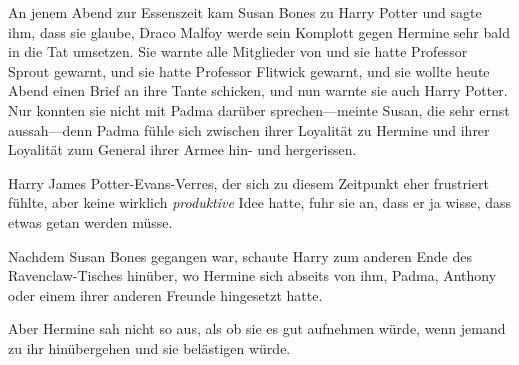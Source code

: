 \later

An jenem Abend zur Essenszeit kam Susan Bones zu Harry Potter und sagte ihm, dass sie glaube, Draco Malfoy werde sein Komplott gegen Hermine sehr bald in die Tat umsetzen. Sie warnte alle Mitglieder von \SPHEW und sie hatte Professor Sprout gewarnt, und sie hatte Professor Flitwick gewarnt, und sie wollte heute Abend einen Brief an ihre Tante schicken, und nun warnte sie auch Harry Potter. Nur konnten sie nicht mit Padma darüber sprechen—meinte Susan, die sehr ernst aussah—denn Padma fühle sich zwischen ihrer Loyalität zu Hermine und ihrer Loyalität zum General ihrer Armee hin- und hergerissen.

Harry James Potter-Evans-Verres, der sich zu diesem Zeitpunkt eher frustriert fühlte, aber keine wirklich \emph{produktive} Idee hatte, fuhr sie an, dass er ja wisse, dass etwas getan werden müsse.

Nachdem Susan Bones gegangen war, schaute Harry zum anderen Ende des Ravenclaw-Tisches hinüber, wo Hermine sich abseits von ihm, Padma, Anthony oder einem ihrer anderen Freunde hingesetzt hatte.

Aber Hermine sah nicht so aus, als ob sie es gut aufnehmen würde, wenn jemand zu ihr hinübergehen und sie belästigen würde.

